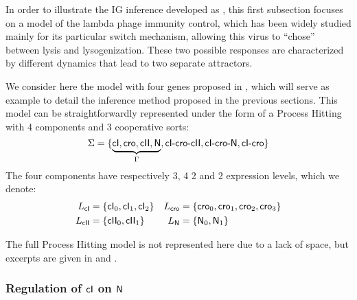 
\label{ssec:phage-lambda}

\newcommand{\cI}{\f{cI}}
\newcommand{\cro}{\f{cro}}
\newcommand{\cII}{\f{cII}}
\newcommand{\N}{\f{N}}

\newcommand{\tcIcrocII}{cI\mbox{-}cro\mbox{-}cII}
\newcommand{\tcIcroN}{cI\mbox{-}cro\mbox{-}N}
\newcommand{\tcIcro}{cI\mbox{-}cro}
\newcommand{\cIcrocII}{\f{\tcIcrocII}}
\newcommand{\cIcroN}{\f{\tcIcroN}}
\newcommand{\cIcro}{\f{\tcIcro}}

In order to illustrate the IG inference developed as ,
this first subsection focuses on a model of the lambda phage immunity control,
which has been widely studied mainly for its particular switch mechanism,
allowing this virus to “chose” between lysis and lysogenization.
These two possible responses are characterized by different dynamics that lead to two
separate attractors.

We consider here the model with four genes proposed in \cite{thieffry_dynamical_1995},
which will serve as example to detail the inference method proposed in the previous sections.
This model can be straightforwardly represented under the form of a Process Hitting
with 4 components %
and 3 cooperative sorts: %
$$\PHs = \{ \underbrace{\cI, \cro, \cII, \N}_{\Gamma}, \cIcrocII, \cIcroN, \cIcro \}$$
The four components have respectively 3, 4 2 and 2 expression levels,
which we denote:
\begin{align*}
  \PHl_{\cI} &= \{ \cI_0, \cI_1, \cI_2 \} &
  \PHl_{\cro} &= \{ \cro_0, \cro_1, \cro_2, \cro_3 \} \\
  \PHl_{\cII} &= \{ \cII_0, \cII_1 \} &
  \PHl_{\N} &= \{ \N_0, \N_1 \} \\
\end{align*}

The full Process Hitting model is not represented here due to a lack of space,
but excerpts are given in  and .



\subsubsection{Regulation of $\cI$ on $\N$}

